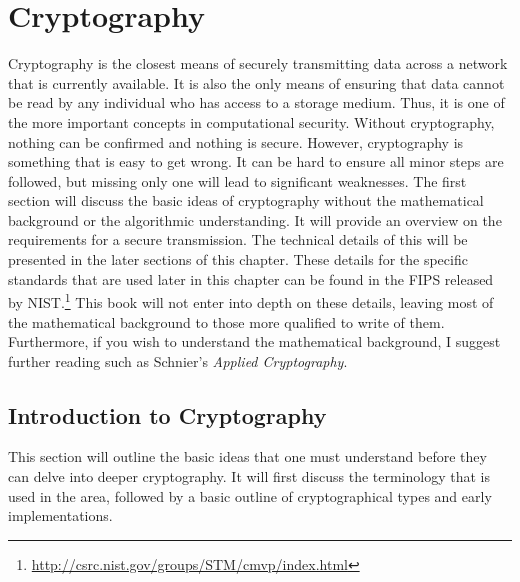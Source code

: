 \chapter{Cryptography}
	\label{ch:Cryptography}
		Cryptography is the closest means of securely transmitting data across a network that is currently available.
		It is also the only means of ensuring that data cannot be read by any individual who has access to a storage medium.
		Thus, it is one of the more important concepts in computational security.
		Without cryptography, nothing can be confirmed and nothing is secure.
		However, cryptography is something that is easy to get wrong.
		It can be hard to ensure all minor steps are followed, but missing only one will lead to significant weaknesses.
		The first section will discuss the basic ideas of cryptography without the mathematical background or the algorithmic understanding.
		It will provide an overview on the requirements for a secure transmission.
		The technical details of this will be presented in the later sections of this chapter.
		These details for the specific standards that are used later in this chapter can be found in the FIPS released by NIST.\footnote{\url{http://csrc.nist.gov/groups/STM/cmvp/index.html}}
		This book will not enter into depth on these details, leaving most of the mathematical background to those more qualified to write of them.
		Furthermore, if you wish to understand the mathematical background, I suggest further reading such as Schnier's \textit{Applied Cryptography}\cite{ACrypto}.

	\section{Introduction to Cryptography}
		This section will outline the basic ideas that one must understand before they can delve into deeper cryptography.
		It will first discuss the terminology that is used in the area, followed by a basic outline of cryptographical types and early implementations.
